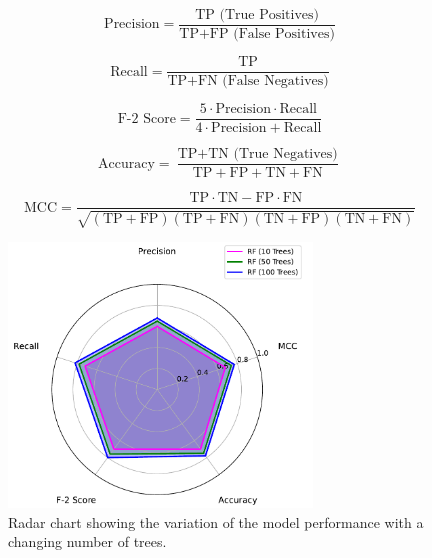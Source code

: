 \begin{equation}
\label{eq:precision}
\text{Precision} = \frac{\text{TP (True Positives)}}{\text{TP} + \text{FP (False Positives)}}
\end{equation}

\begin{equation}
\text{Recall} = \frac{\text{TP}}{\text{TP} + \text{FN (False Negatives)}}
\end{equation}

\begin{equation}
\text{F-}2\text{ Score} = \frac{5 \cdot \text{Precision} \cdot \text{Recall}}{4 \cdot \text{Precision} + \text{Recall}}
\end{equation}

\begin{equation}
\text{Accuracy} = \frac{\text{TP} + \text{TN (True Negatives)}}{\text{TP} + \text{FP} + \text{TN} + \text{FN}}
\end{equation}

\begin{equation}
\label{eq:mcc}
\text{MCC} = \frac{ \text{TP} \cdot \text{TN} - \text{FP} \cdot \text{FN} }{ \sqrt{ (\text{TP} + \text{FP}) (\text{TP} + \text{FN}) (\text{TN} + \text{FP}) (\text{TN} + \text{FN}) } }
\end{equation}




\begin{figure}[H]
\centering
\includegraphics[width=0.72\textwidth]{figs/Samuel/Figures/rf_comparison (3) (1).pdf}
\caption[Radar chart showing the performance of the random forest model]{Radar chart showing the variation of the model performance with a changing number of trees.}
\label{fig:radchart}
\end{figure}






